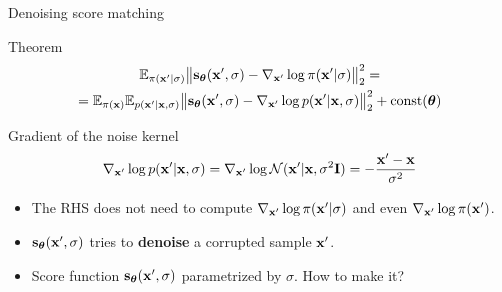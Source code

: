 \begin{frame}{Denoising score matching}
	\begin{block}{Theorem}
	\vspace{-0.5cm}
	\begin{multline*}
		\mathbb{E}_{\pi(\mathbf{x}' | \sigma)}\bigl\| \mathbf{s}_{\boldsymbol{\theta}}(\mathbf{x}', \sigma) - \nabla_{\mathbf{x}'} \log \pi(\mathbf{x}' | \sigma) \bigr\|^2_2 = \\ = \mathbb{E}_{\pi(\mathbf{x})} \mathbb{E}_{p(\mathbf{x}' | \mathbf{x}, \sigma)}\bigl\| \mathbf{s}_{\boldsymbol{\theta}}(\mathbf{x}', \sigma) - \nabla_{\mathbf{x}'} \log p(\mathbf{x}' | \mathbf{x}, \sigma) \bigr\|^2_2 + \text{const}(\boldsymbol{\theta})
	\end{multline*}
	\vspace{-0.5cm}
	\end{block}
	\begin{block}{Gradient of the noise kernel}
	\vspace{-0.3cm}
	\[
		\nabla_{\mathbf{x}'} \log p(\mathbf{x}' | \mathbf{x}, \sigma) = \nabla_{\mathbf{x}'} \log \mathcal{N}(\mathbf{x}' | \mathbf{x}, \sigma^2 \mathbf{I}) = - \frac{\mathbf{x}' - \mathbf{x}}{\sigma^2}
	\]
	\vspace{-0.3cm}
	\end{block}
	\begin{itemize}
		\item The RHS does not need to compute $\nabla_{\mathbf{x}'} \log \pi(\mathbf{x}' | \sigma)$ and even $\nabla_{\mathbf{x}'} \log \pi(\mathbf{x}')$.
		\item $\mathbf{s}_{\boldsymbol{\theta}}(\mathbf{x}', \sigma)$ tries to \textbf{denoise} a corrupted sample $\mathbf{x}'$.
		\item Score function $\mathbf{s}_{\boldsymbol{\theta}}(\mathbf{x}', \sigma)$ parametrized by $\sigma$. How to make it?
	\end{itemize}
\end{frame}
